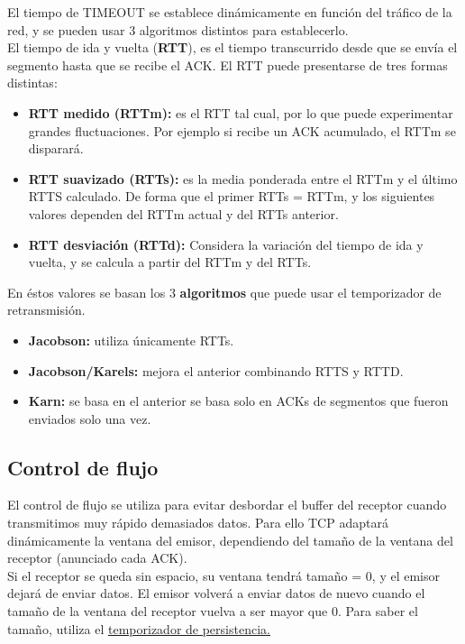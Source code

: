 \begin{onepage}
\begin{tcolorbox}[
title=Temporizador de retransmisión (TIMEOUT),
colback=cyan!5!white,
colframe=cyan!75!black,
fonttitle=\bfseries]
El tiempo de TIMEOUT se establece dinámicamente en función del tráfico de la red, y se pueden usar 3 algoritmos distintos para establecerlo.\\

El tiempo de ida y vuelta (\textbf{RTT}), es el tiempo transcurrido desde que se envía el
segmento hasta que se recibe el ACK. El RTT puede presentarse de tres formas distintas:
\begin{itemize}
    \item \textbf{RTT medido (RTTm): }es el RTT tal cual, por lo que puede experimentar grandes fluctuaciones. Por ejemplo si recibe un ACK acumulado, el RTTm se disparará.
    \item \textbf{RTT suavizado (RTTs): }es la media ponderada entre el RTTm y el último RTTS calculado. De forma que el primer RTTs = RTTm, y los siguientes valores dependen del RTTm actual y del RTTs anterior.
    \item \textbf{RTT desviación (RTTd): }Considera la variación del tiempo de ida y vuelta, y se calcula a partir del RTTm y del RTTs.
\end{itemize}

En éstos valores se basan los 3 \textbf{algoritmos} que puede usar el temporizador de retransmisión.
\begin{itemize}
    \item \textbf{Jacobson: }utiliza únicamente RTTs.
    \item \textbf{Jacobson/Karels: }mejora el anterior combinando RTTS y RTTD.
    \item \textbf{Karn: }se basa en el anterior se basa solo en ACKs de segmentos que fueron enviados solo una vez.
\end{itemize}
\end{tcolorbox}
\subsection{Control de flujo}
El control de flujo se utiliza para evitar desbordar el buffer del receptor cuando transmitimos muy rápido demasiados datos. Para ello TCP adaptará dinámicamente la ventana del emisor, dependiendo del tamaño de la ventana del receptor (anunciado cada ACK).\\

Si el receptor se queda sin espacio, su ventana tendrá tamaño = 0, y el emisor dejará de enviar datos. El emisor volverá a enviar datos de nuevo cuando el tamaño de la ventana del receptor vuelva a ser mayor que 0. Para saber el tamaño, utiliza el \underline{\hyperref[tempers]{temporizador de persistencia.}}

\end{onepage}
